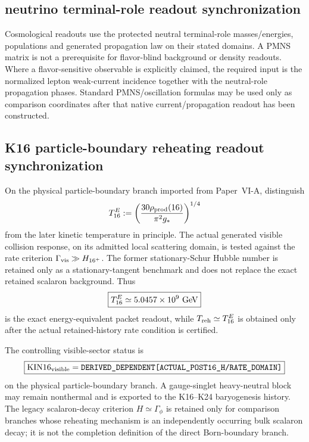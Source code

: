 \documentclass[12pt,a4paper]{article}
\begin{document}







\subsection{neutrino terminal-role readout synchronization}
\label{p9:sec:v198-neutrino-role-readout-sync}

Cosmological readouts use the protected neutral terminal-role masses/energies,
populations and generated propagation law on their stated domains.  A PMNS
matrix is not a prerequisite for flavor-blind background or density readouts.
Where a flavor-sensitive observable is explicitly claimed, the required input
is the normalized lepton weak-current incidence together with the neutral-role
propagation phases.  Standard PMNS/oscillation formulas may be used only as
comparison coordinates after that native current/propagation readout has been
constructed.




\subsection{K16 particle-boundary reheating readout synchronization}
\label{p9:sec:v199-k16-reheating-readout-sync}

On the physical particle-boundary branch imported from Paper~VI-A, distinguish
\[
 T_{16}^{E}
 :=\left(\frac{30\rho_{\rm prod}(16)}{\pi^2g_\ast}\right)^{1/4}
\]
from the later kinetic temperature in principle.  The actual generated visible collision response, on its admitted local
scattering domain, is tested against the rate criterion
$\Gamma_{\rm vis}\gg H_{16^+}$.  The former stationary-Schur Hubble number is
retained only as a stationary-tangent benchmark and does not replace the exact
retained scalaron background.  Thus
\[
 \boxed{T_{16}^{E}\simeq5.0457\times10^9\ {\rm GeV}}
\]
is the exact energy-equivalent packet readout, while
$T_{\rm reh}\simeq T_{16}^{E}$ is obtained only after the actual
retained-history rate condition is certified.

The controlling visible-sector status is
\[
 \boxed{\mathrm{KIN16}_{\rm visible}
 =\texttt{DERIVED\_DEPENDENT[ACTUAL\_POST16\_H/RATE\_DOMAIN]}}
\]
on the physical particle-boundary branch.  A gauge-singlet heavy-neutral block
may remain nonthermal and is exported to the K16--K24 baryogenesis history.
The legacy scalaron-decay criterion $H\simeq\Gamma_\phi$ is retained only for
comparison branches whose reheating mechanism is an independently occurring
bulk scalaron decay; it is not the completion definition of the direct
Born-boundary branch.
\end{document}
